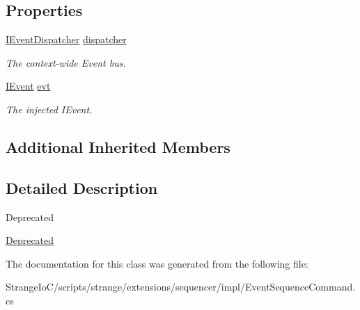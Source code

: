 \subsection*{Properties}
\begin{DoxyCompactItemize}
\item 
\hypertarget{classstrange_1_1extensions_1_1sequencer_1_1impl_1_1_event_sequence_command_a3b0bd45295ae480feb228090153e4aa4}{\hyperlink{interfacestrange_1_1extensions_1_1dispatcher_1_1eventdispatcher_1_1api_1_1_i_event_dispatcher}{I\-Event\-Dispatcher} \hyperlink{classstrange_1_1extensions_1_1sequencer_1_1impl_1_1_event_sequence_command_a3b0bd45295ae480feb228090153e4aa4}{dispatcher}}\label{classstrange_1_1extensions_1_1sequencer_1_1impl_1_1_event_sequence_command_a3b0bd45295ae480feb228090153e4aa4}

\begin{DoxyCompactList}\small\item\em The context-\/wide Event bus. \end{DoxyCompactList}\item 
\hypertarget{classstrange_1_1extensions_1_1sequencer_1_1impl_1_1_event_sequence_command_a9299b7ee26623269418a2f54b4158101}{\hyperlink{interfacestrange_1_1extensions_1_1dispatcher_1_1eventdispatcher_1_1api_1_1_i_event}{I\-Event} \hyperlink{classstrange_1_1extensions_1_1sequencer_1_1impl_1_1_event_sequence_command_a9299b7ee26623269418a2f54b4158101}{evt}}\label{classstrange_1_1extensions_1_1sequencer_1_1impl_1_1_event_sequence_command_a9299b7ee26623269418a2f54b4158101}

\begin{DoxyCompactList}\small\item\em The injected I\-Event. \end{DoxyCompactList}\end{DoxyCompactItemize}
\subsection*{Additional Inherited Members}


\subsection{Detailed Description}
\begin{DoxyRefDesc}{Deprecated}
\item[\hyperlink{deprecated__deprecated000004}{Deprecated}]\end{DoxyRefDesc}


The documentation for this class was generated from the following file\-:\begin{DoxyCompactItemize}
\item 
Strange\-Io\-C/scripts/strange/extensions/sequencer/impl/Event\-Sequence\-Command.\-cs\end{DoxyCompactItemize}
